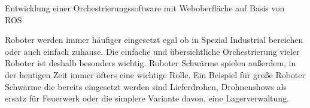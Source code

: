 \begin{flushleft}
    Entwicklung einer Orchestrierungssoftware mit Weboberfläche auf Basis von ROS.

    Roboter werden immer häufiger eingesetzt egal ob in Spezial Industrial bereichen oder auch einfach zuhause.
    Die einfache und übersichtliche Orchestrierung vieler Roboter ist deshalb besonders wichtig.
    Roboter Schwärme spielen außerdem, in der heutigen Zeit immer öfters eine wichtige Rolle.
    Ein Beispiel für große Roboter Schwärme die bereits eingesetzt werden sind Lieferdrohen, Drohnenshows als 
    ersatz für Feuerwerk oder die simplere Variante davon, eine Lagerverwaltung.
\end{flushleft}